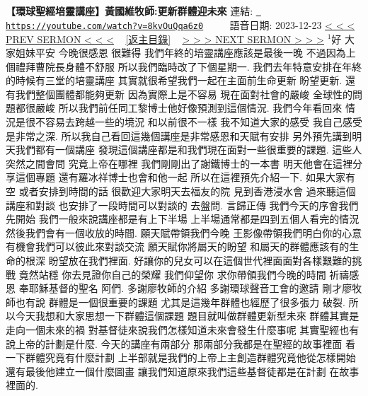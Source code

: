 \documentclass{book}
\begin{document}
\section{}
\label{sec:8kvOuQqa6z0}
\textbf{【環球聖經培靈講座】黃國維牧師:更新群體迎未來}
\newline
\newline
連結: \href{https://youtube.com/watch?v=8kvOuQqa6z0}{\texttt{ https://youtube.com/watch?v=8kvOuQqa6z0}} ~~~~ 語音日期: 2023-12-23 
\newline
\newline
\hyperref[sec:ulPz82PUrr0]{\small{< < < PREV SERMON < < <}}
~
\hyperref[sec:index]{\small{[返主目錄]}}
~
\hyperref[sec:PkwOeUk00co]{\small{> > > NEXT SERMON > > >}}
\newline
\newline
$^{1}$好 大家姐妹平安 今晚很感恩 很難得 我們年終的培靈講座應該是最後一晚 不過因為上個禮拜曹院長身體不舒服 所以我們臨時改了下個星期一.
我們去年特意安排在年終的時候有三堂的培靈講座 其實就很希望我們一起在主面前生命更新 盼望更新.
還有我們整個團體都能夠更新 因為實際上是不容易 現在面對社會的嚴峻 全球性的問題都很嚴峻 所以我們前任同工黎博士他好像預測到這個情況.
我們今年看回來 情況是很不容易去跨越一些的境況 和以前很不一樣 我不知道大家的感受 我自己感受是非常之深.
所以我自己看回這幾個講座是非常感恩和天賦有安排 另外預先講到明天我們都有一個講座 發現這個講座都是和我們現在面對一些很重要的課題.
這些人突然之間會問 究竟上帝在哪裡 我們剛剛出了謝鐵博士的一本書 明天他會在這裡分享這個專題 還有羅冰祥博士也會和他一起 所以在這裡預先介紹一下.
如果大家有空 或者安排到時間的話 很歡迎大家明天去福友的院 見到香港浸水會 過來聽這個講座和對談 也安排了一段時間可以對談的 去盤問.
言歸正傳 我們今天的序會我們先開始 我們一般來說講座都是有上下半場 上半場通常都是四到五個人看完的情況 然後我們會有一個收放的時間.
願天賦帶領我們今晚 王影像帶領我們明白你的心意 有機會我們可以彼此來對談交流 願天賦你將屬天的盼望 和屬天的群體應該有的生命的根深 盼望放在我們裡面.
好讓你的兒女可以在這個世代裡面面對各樣艱難的挑戰 竟然站穩 你去見證你自己的榮耀 我們仰望你 求你帶領我們今晚的時間 祈禱感恩 奉耶穌基督的聖名 阿們.
多謝廖牧師的介紹 多謝環球聲音工會的邀請 剛才廖牧師也有說 群體是一個很重要的課題 尤其是這幾年群體也經歷了很多張力 破裂.
所以今天我想和大家思想一下群體這個課題 題目就叫做群體更新型未來 群體其實是走向一個未來的禍 對基督徒來說我們怎樣知道未來會發生什麼事呢 其實聖經也有說上帝的計劃是什麼.
今天的講座有兩部分 那兩部分我都是在聖經的故事裡面 看一下群體究竟有什麼計劃 上半部就是我們的上帝上主創造群體究竟他從怎樣開始 還有最後他建立一個什麼圖畫 讓我們知道原來我們這些基督徒都是在計劃 在故事裡面的.
\end{document}
